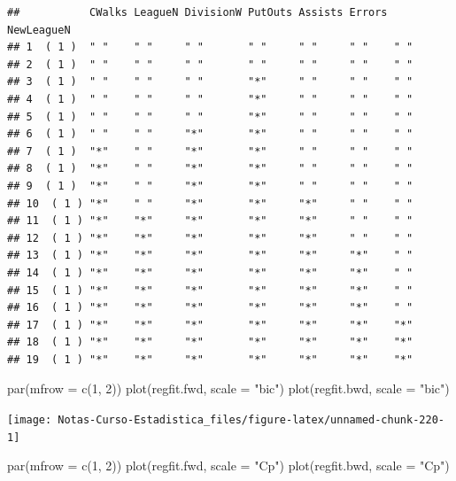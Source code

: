 \documentclass[
  12pt,
]{book}
\newenvironment{Shaded}{\begin{snugshade}}{\end{snugshade}}
\newcommand{\AttributeTok}[1]{\textcolor[rgb]{0.77,0.63,0.00}{#1}}
\newcommand{\DecValTok}[1]{\textcolor[rgb]{0.00,0.00,0.81}{#1}}
\newcommand{\FunctionTok}[1]{\textcolor[rgb]{0.00,0.00,0.00}{#1}}
\newcommand{\NormalTok}[1]{#1}
\newcommand{\StringTok}[1]{\textcolor[rgb]{0.31,0.60,0.02}{#1}}
\theoremstyle{definition}
\theoremstyle{definition}
\theoremstyle{definition}
\theoremstyle{definition}
\theoremstyle{remark}
\begin{document}
\begin{verbatim}
##           CWalks LeagueN DivisionW PutOuts Assists Errors NewLeagueN
## 1  ( 1 )  " "    " "     " "       " "     " "     " "    " "       
## 2  ( 1 )  " "    " "     " "       " "     " "     " "    " "       
## 3  ( 1 )  " "    " "     " "       "*"     " "     " "    " "       
## 4  ( 1 )  " "    " "     " "       "*"     " "     " "    " "       
## 5  ( 1 )  " "    " "     " "       "*"     " "     " "    " "       
## 6  ( 1 )  " "    " "     "*"       "*"     " "     " "    " "       
## 7  ( 1 )  "*"    " "     "*"       "*"     " "     " "    " "       
## 8  ( 1 )  "*"    " "     "*"       "*"     " "     " "    " "       
## 9  ( 1 )  "*"    " "     "*"       "*"     " "     " "    " "       
## 10  ( 1 ) "*"    " "     "*"       "*"     "*"     " "    " "       
## 11  ( 1 ) "*"    "*"     "*"       "*"     "*"     " "    " "       
## 12  ( 1 ) "*"    "*"     "*"       "*"     "*"     " "    " "       
## 13  ( 1 ) "*"    "*"     "*"       "*"     "*"     "*"    " "       
## 14  ( 1 ) "*"    "*"     "*"       "*"     "*"     "*"    " "       
## 15  ( 1 ) "*"    "*"     "*"       "*"     "*"     "*"    " "       
## 16  ( 1 ) "*"    "*"     "*"       "*"     "*"     "*"    " "       
## 17  ( 1 ) "*"    "*"     "*"       "*"     "*"     "*"    "*"       
## 18  ( 1 ) "*"    "*"     "*"       "*"     "*"     "*"    "*"       
## 19  ( 1 ) "*"    "*"     "*"       "*"     "*"     "*"    "*"
\end{verbatim}

\begin{Shaded}
\begin{Highlighting}[]
\FunctionTok{par}\NormalTok{(}\AttributeTok{mfrow =} \FunctionTok{c}\NormalTok{(}\DecValTok{1}\NormalTok{, }\DecValTok{2}\NormalTok{))}
\FunctionTok{plot}\NormalTok{(regfit.fwd, }\AttributeTok{scale =} \StringTok{"bic"}\NormalTok{)}
\FunctionTok{plot}\NormalTok{(regfit.bwd, }\AttributeTok{scale =} \StringTok{"bic"}\NormalTok{)}
\end{Highlighting}
\end{Shaded}

\begin{center}\texttt{[image: Notas-Curso-Estadistica\_files/figure-latex/unnamed-chunk-220-1]} \end{center}

\begin{Shaded}
\begin{Highlighting}[]
\FunctionTok{par}\NormalTok{(}\AttributeTok{mfrow =} \FunctionTok{c}\NormalTok{(}\DecValTok{1}\NormalTok{, }\DecValTok{2}\NormalTok{))}
\FunctionTok{plot}\NormalTok{(regfit.fwd, }\AttributeTok{scale =} \StringTok{"Cp"}\NormalTok{)}
\FunctionTok{plot}\NormalTok{(regfit.bwd, }\AttributeTok{scale =} \StringTok{"Cp"}\NormalTok{)}
\end{Highlighting}
\end{Shaded}
\end{document}
